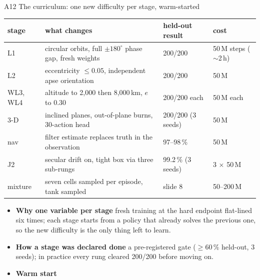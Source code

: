 \documentclass[aspectratio=169,11pt]{beamer}
\begin{document}
\begin{frame}{A12 \; The curriculum: one new difficulty per stage, warm-started}
\scriptsize
\begin{tabular}{@{}llll@{}}
\toprule
stage & what changes & held-out result & cost\\
\midrule
L1 & circular orbits, full $\pm180^\circ$ phase gap, fresh weights & 200/200 & 50\,M steps ($\sim$2\,h)\\
L2 & eccentricity $\le0.05$, independent apse orientation & 200/200 & 50\,M\\
WL3, WL4 & altitude to 2,000 then 8,000\,km, $e$ to 0.30 & 200/200 each & 50\,M each\\
3-D & inclined planes, out-of-plane burns, 30-action head & 200/200 (3 seeds) & 50\,M\\
nav & filter estimate replaces truth in the observation & 97--98\,\% & 50\,M\\
J2 & secular drift on, tight box via three sub-rungs & 99.2\,\% (3 seeds) & 3 $\times$ 50\,M\\
mixture & seven cells sampled per episode, tank sampled & slide 8 & 50--200\,M\\
\bottomrule
\end{tabular}
\vspace{1mm}
\begin{itemize}\scriptsize
  \item \textbf{Why one variable per stage} \; fresh training at the hard endpoint flat-lined six times; each stage starts from a policy that already solves the previous one, so the new difficulty is the only thing left to learn.
  \item \textbf{How a stage was declared done} \; a pre-registered gate ($\ge60\,\%$ held-out, 3 seeds); in practice every rung cleared 200/200 before moving on.
  \item \textbf{Warm start}
\end{itemize}
\end{frame}
\end{document}
